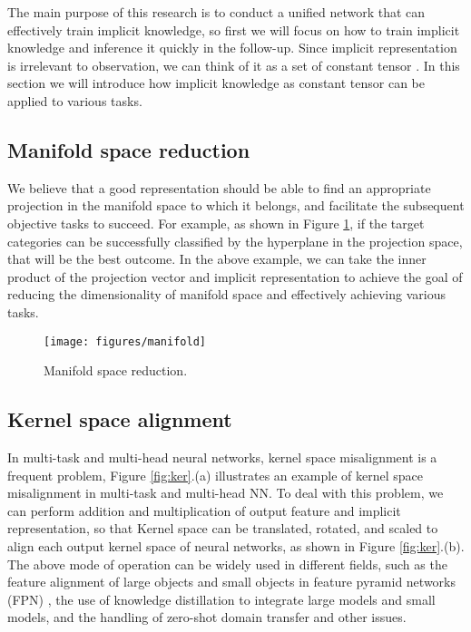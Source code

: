 \documentclass[10pt,twocolumn,letterpaper]{article}
\begin{document}
The main purpose of this research is to conduct a unified network that can effectively train implicit knowledge, so first we will focus on how to train implicit knowledge and inference it quickly in the follow-up. Since implicit representation  is irrelevant to observation, we can think of it as a set of constant tensor . In this section we will introduce how implicit knowledge as constant tensor can be applied to various tasks.

\subsection{Manifold space reduction}

We believe that a good representation should be able to find an appropriate projection in the manifold space to which it belongs, and facilitate the subsequent objective tasks to succeed. For example, as shown in Figure \ref{fig:mani}, if the target categories can be successfully classified by the hyperplane in the projection space, that will be the best outcome. In the above example, we can take the inner product of the projection vector and implicit representation to achieve the goal of reducing the dimensionality of manifold space and effectively achieving various tasks.

\begin{figure}[h]
	\begin{center}
		\texttt{[image: figures/manifold]}
	\end{center}
	\caption{Manifold space reduction.}
	\label{fig:mani}
\end{figure}

\subsection{Kernel space alignment}

In multi-task and multi-head neural networks, kernel space misalignment is a frequent problem, Figure \ref{fig:ker}.(a) illustrates an example of kernel space misalignment in multi-task and multi-head NN. To deal with this problem, we can perform addition and multiplication of output feature and implicit representation, so that Kernel space can be translated, rotated, and scaled to align each output kernel space of neural networks, as shown in Figure \ref{fig:ker}.(b). The above mode of operation can be widely used in different fields, such as the feature alignment of large objects and small objects in feature pyramid networks (FPN) \cite{lin2017feature}, the use of knowledge distillation to integrate large models and small models, and the handling of zero-shot domain transfer and other issues.
\end{document}

